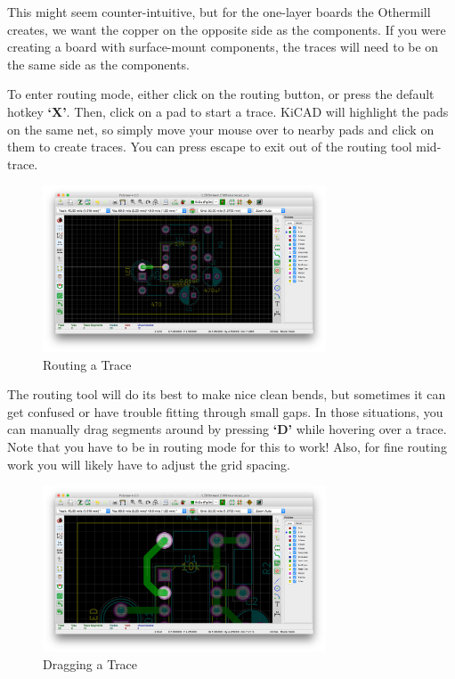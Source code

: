 \documentclass[12pt, oneside]{article}
\begin{document}
This might seem counter-intuitive, but for the one-layer boards the Othermill creates, we want the copper on the opposite side as the components. If you were creating a board with surface-mount components, the traces will need to be on the same side as the components. 

To enter routing mode, either click on the routing button, or press the default hotkey \textbf{`X'}. Then, click on a pad to start a trace. KiCAD will highlight the pads on the same net, so simply move your mouse over to nearby pads and click on them to create traces. You can press escape to exit out of the routing tool mid-trace. 

\begin{figure}[H]
\includegraphics[width=0.75\textwidth]{RoutingTrace}
\centering
\caption{Routing a Trace}
\end{figure}

The routing tool will do its best to make nice clean bends, but sometimes it can get confused or have trouble fitting through small gaps. In those situations, you can manually drag segments around by pressing \textbf{`D'} while hovering over a trace. Note that you have to be in routing mode for this to work! Also, for fine routing work you will likely have to adjust the grid spacing.


\begin{figure}[H]
\includegraphics[width=0.75\textwidth]{DragTrace}
\centering
\caption{Dragging a Trace}
\end{figure}
\end{document}
